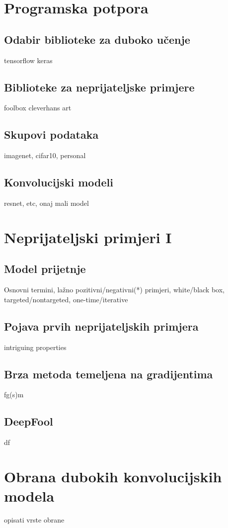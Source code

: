 \documentclass[utf8, diplomski]{fer}
\begin{document}
\chapter{Programska potpora}
\section{Odabir biblioteke za duboko učenje}
tensorflow\citep{abadi2016tensorflow} keras\citep{chollet2015keras}
\section{Biblioteke za neprijateljske primjere}
foolbox\citep{rauber2017foolbox} cleverhans\citep{papernot2018cleverhans} art\citep{art2018}
\section{Skupovi podataka}
imagenet, cifar10, personal
\section{Konvolucijski modeli}
resnet, etc, onaj mali model


\chapter{Neprijateljski primjeri I}
\section{Model prijetnje}
Osnovni termini, lažno pozitivni/negativni(*) primjeri, white/black box, targeted/nontargeted, one-time/iterative \citep{Yuan2019AdversarialEA}
\section{Pojava prvih neprijateljskih primjera}
intriguing properties\citep{Szegedy2014IntriguingPO}
\section{Brza metoda temeljena na gradijentima}
fg(s)m\citep{Goodfellow2015ExplainingAH}
\section{DeepFool} df\citep{MoosaviDezfooli2016DeepFoolAS}


\chapter{Obrana dubokih konvolucijskih modela}
opisati vrste obrane \\
\end{document}
